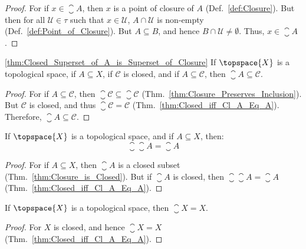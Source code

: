         \begin{proof}
            For if $x\in\closure{A}$, then $x$ is a point of closure of $A$
            (Def.~\ref{def:Closure}). But then for all $\mathcal{U}\in\tau$
            such that $x\in\mathcal{U}$, $A\cap\mathcal{U}$ is non-empty
            (Def.~\ref{def:Point_of_Closure}). But $A\subseteq{B}$, and
            hence $B\cap\mathcal{U}\ne\emptyset$. Thus, $x\in\closure{A}$.
        \end{proof}
        \begin{theorem}
            \ref{thm:Closed_Superset_of_A_is_Superset_of_Closure}%
            If $\topspace{X}$ is a topological space, if $A\subseteq{X}$,
            if $\mathcal{C}$ is closed, and if $A\subseteq\mathcal{C}$,
            then $\closure{A}\subseteq\mathcal{C}$.
        \end{theorem}
        \begin{proof}
            For if $A\subseteq\mathcal{C}$, then
            $\closure{\mathcal{C}}\subseteq\closure{\mathcal{C}}$
            (Thm.~\ref{thm:Closure_Preserves_Inclusion}). But $\mathcal{C}$
            is closed, and thus $\closure{\mathcal{C}}=\mathcal{C}$
            (Thm.~\ref{thm:Closed_iff_Cl_A_Eq_A}). Therefore,
            $\closure{A}\subseteq\mathcal{C}$.
        \end{proof}
        \begin{theorem}
            \label{thm:Idempotence_of_Closure}%
            If $\topspace{X}$ is a topological space, and if
            $A\subseteq{X}$, then:
            \begin{equation}
                \closure{\closure{A}}=\closure{A}
            \end{equation}
        \end{theorem}
        \begin{proof}
            For if $A\subseteq{X}$, then $\closure{A}$ is a closed subset
            (Thm.~\ref{thm:Closure_is_Closed}). But if $\closure{A}$ is
            closed, then $\closure{\closure{A}}=\closure{A}$
            (Thm.~\ref{thm:Closed_iff_Cl_A_Eq_A}).
        \end{proof}
        \begin{theorem}
            \label{thm:Closure_of_Whole_Space}%
            If $\topspace{X}$ is a topological space, then $\closure{X}=X$.
        \end{theorem}
        \begin{proof}
            For $X$ is closed, and hence $\closure{X}=X$
            (Thm.~\ref{thm:Closed_iff_Cl_A_Eq_A}).
        \end{proof}
